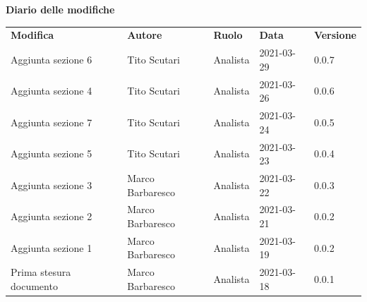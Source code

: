 \documentclass[a4paper]{article}
\begin{document}
    \begin{center}
        \textbf{\Large Diario delle modifiche}\\
        \vspace{10px}
        \begin{table}[h!]
        \centering
        \renewcommand{\arraystretch}{1.8}
        \begin{tabular}{p{150px} p{90px} p{50px} p{60px} p{45px}}
            \rowcolor{logo!70} \textbf{Modifica} & \textbf{Autore} & \textbf{Ruolo} & \textbf{Data} & \textbf{Versione}\\
            Aggiunta sezione 6 & Tito Scutari     & Analista & 2021-03-29 & 0.0.7 \\
            Aggiunta sezione 4 & Tito Scutari     & Analista & 2021-03-26 & 0.0.6 \\
            Aggiunta sezione 7 & Tito Scutari     & Analista & 2021-03-24 & 0.0.5 \\
            Aggiunta sezione 5 & Tito Scutari     & Analista & 2021-03-23 & 0.0.4 \\
            Aggiunta sezione 3 & Marco Barbaresco & Analista & 2021-03-22 & 0.0.3 \\
            Aggiunta sezione 2 & Marco Barbaresco & Analista & 2021-03-21 & 0.0.2 \\
            Aggiunta sezione 1 & Marco Barbaresco & Analista & 2021-03-19 & 0.0.2 \\
            Prima stesura documento & Marco Barbaresco & Analista & 2021-03-18 & 0.0.1 \\

        \end{tabular}
    \end{table}
    \end{center}

    \newpage
    \tableofcontents
    \newpage
    \newpage
    \listoftables
    \newpage
    
    
    
    
    
    
    
 
\end{document}

